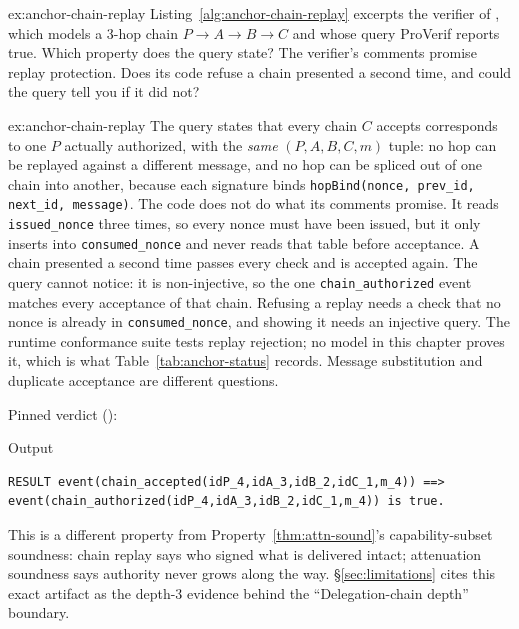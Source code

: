 \documentclass[11pt,a4paper]{article}
\theoremstyle{definition}
\begin{document}
\begin{pdexercise}[kind=Check,rating=1]{ex:anchor-chain-replay}
Listing~\ref{alg:anchor-chain-replay} excerpts the verifier of , which models a 3-hop chain $P \to A \to B \to C$ and whose query ProVerif reports true. Which property does the query state? The verifier's comments promise replay protection. Does its code refuse a chain presented a second time, and could the query tell you if it did not?
\end{pdexercise}
\begin{pdsolution}{ex:anchor-chain-replay}
The query states that every chain $C$ accepts corresponds to one $P$ actually authorized, with the \emph{same} $(P,A,B,C,m)$ tuple: no hop can be replayed against a different message, and no hop can be spliced out of one chain into another, because each signature binds \texttt{hopBind(nonce, prev\_id, next\_id, message)}. The code does not do what its comments promise. It reads \texttt{issued\_nonce} three times, so every nonce must have been issued, but it only inserts into \texttt{consumed\_nonce} and never reads that table before acceptance. A chain presented a second time passes every check and is accepted again. The query cannot notice: it is non-injective, so the one \texttt{chain\_authorized} event matches every acceptance of that chain. Refusing a replay needs a check that no nonce is already in \texttt{consumed\_nonce}, and showing it needs an injective query. The runtime conformance suite tests replay rejection; no model in this chapter proves it, which is what Table~\ref{tab:anchor-status} records. Message substitution and duplicate acceptance are different questions.

Pinned verdict ():
\begin{pdlisting}{Output}{}
\begin{lstlisting}[style=pdoutput]
RESULT event(chain_accepted(idP_4,idA_3,idB_2,idC_1,m_4)) ==> event(chain_authorized(idP_4,idA_3,idB_2,idC_1,m_4)) is true.
\end{lstlisting}
\end{pdlisting}
This is a different property from Property~\ref{thm:attn-sound}'s capability-subset soundness: chain replay says who signed what is delivered intact; attenuation soundness says authority never grows along the way. \S\ref{sec:limitations} cites this exact artifact as the depth-3 evidence behind the ``Delegation-chain depth'' boundary.
\end{pdsolution}
\end{document}
